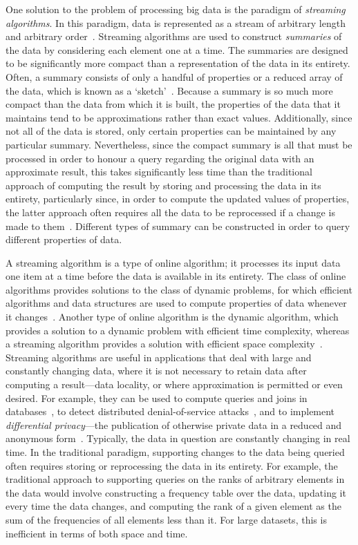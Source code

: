 One solution to the problem of processing big data is the paradigm of \emph{streaming algorithms}.
In this paradigm, data is represented as a stream of arbitrary length and arbitrary order~\citep{cormode20}.
Streaming algorithms are used to construct \emph{summaries} of the data by considering each element one at a time.
The summaries are designed to be significantly more compact than a representation of the data in its entirety.
Often, a summary consists of only a handful of properties or a reduced array of the data, which is known as a `sketch'~\citep{babcock02}.
Because a summary is so much more compact than the data from which it is built, the properties of the data that it maintains tend to be approximations rather than exact values.
Additionally, since not all of the data is stored, only certain properties can be maintained by any particular summary.
Nevertheless, since the compact summary is all that must be processed in order to honour a query regarding the original data with an approximate result, this takes significantly less time than the traditional approach of computing the result by storing and processing the data in its entirety, particularly since, in order to compute the updated values of properties, the latter approach often requires all the data to be reprocessed if a change is made to them~\citep{cormode20}.
Different types of summary can be constructed in order to query different properties of data.

A streaming algorithm is a type of online algorithm; it processes its input data one item at a time before the data is available in its entirety.
The class of online algorithms provides solutions to the class of dynamic problems, for which efficient algorithms and data structures are used to compute properties of data whenever it changes~\citep{karp92}.
Another type of online algorithm is the dynamic algorithm, which provides a solution to a dynamic problem with efficient time complexity, whereas a streaming algorithm provides a solution with efficient space complexity~\citep{demetrescu10}.
Streaming algorithms are useful in applications that deal with large and constantly changing data, where it is not necessary to retain data after computing a result---data locality, or where approximation is permitted or even desired.
For example, they can be used to compute queries and joins in databases~\citep{karp87}, to detect distributed denial-of-service attacks~\citep{liu11}, and to implement \emph{differential privacy}---the publication of otherwise private data in a reduced and anonymous form~\citep{cormode12}.
Typically, the data in question are constantly changing in real time.
In the traditional paradigm, supporting changes to the data being queried often requires storing or reprocessing the data in its entirety.
For example, the traditional approach to supporting queries on the ranks of arbitrary elements in the data would involve constructing a frequency table over the data, updating it every time the data changes, and computing the rank of a given element as the sum of the frequencies of all elements less than it.
For large datasets, this is inefficient in terms of both space and time.

